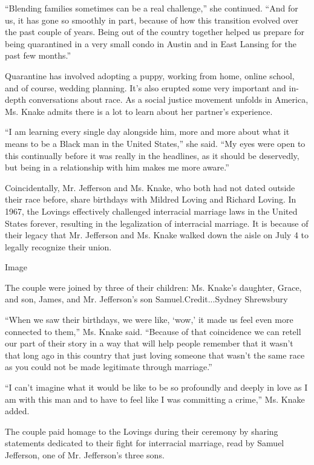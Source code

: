 ``Blending families sometimes can be a real challenge,'' she continued.
``And for us, it has gone so smoothly in part, because of how this
transition evolved over the past couple of years. Being out of the
country together helped us prepare for being quarantined in a very small
condo in Austin and in East Lansing for the past few months.''

Quarantine has involved adopting a puppy, working from home, online
school, and of course, wedding planning. It's also erupted some very
important and in-depth conversations about race. As a social justice
movement unfolds in America, Ms. Knake admits there is a lot to learn
about her partner's experience.

``I am learning every single day alongside him, more and more about what
it means to be a Black man in the United States,'' she said. ``My eyes
were open to this continually before it was really in the headlines, as
it should be deservedly, but being in a relationship with him makes me
more aware.''

Coincidentally, Mr. Jefferson and Ms. Knake, who both had not dated
outside their race before, share birthdays with Mildred Loving and
Richard Loving. In 1967, the Lovings effectively challenged interracial
marriage laws in the United States forever, resulting in the
legalization of interracial marriage. It is because of their legacy that
Mr. Jefferson and Ms. Knake walked down the aisle on July 4 to legally
recognize their union.

Image

The couple were joined by three of their children: Ms. Knake's daughter,
Grace, and son, James, and Mr. Jefferson's son Samuel.Credit...Sydney
Shrewsbury

``When we saw their birthdays, we were like, `wow,' it made us feel even
more connected to them,'' Ms. Knake said. ``Because of that coincidence
we can retell our part of their story in a way that will help people
remember that it wasn't that long ago in this country that just loving
someone that wasn't the same race as you could not be made legitimate
through marriage.''

``I can't imagine what it would be like to be so profoundly and deeply
in love as I am with this man and to have to feel like I was committing
a crime,'' Ms. Knake added.

The couple paid homage to the Lovings during their ceremony by sharing
statements dedicated to their fight for interracial marriage, read by
Samuel Jefferson, one of Mr. Jefferson's three sons.

